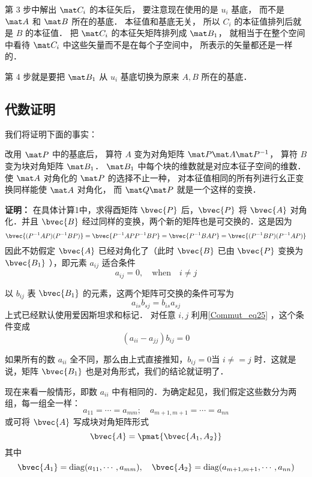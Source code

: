 第 3 步中解出 $\mat C_i$ 的本征矢后， 要注意现在使用的是 $u_i$ 基底， 而不是 $\mat A$ 和 $\mat B$ 所在的基底． 本征值和基底无关， 所以 $C_i$ 的本征值排列后就是 $B$ 的本征值． 把 $\mat C_i$ 的本征矢矩阵排列成 $\mat B_1$， 就相当于在整个空间中看待 $\mat C_i$ 中这些矢量而不是在每个子空间中， 所表示的矢量都还是一样的．

第 4 步就是要把 $\mat B_1$ 从 $u_i$ 基底切换为原来 $A, B$ 所在的基底．


\subsection{代数证明}
我们将证明下面的事实：

改用 $\mat P$ 中的基底后， 算符 $A$ 变为对角矩阵 $\mat P \mat A\mat P^{-1}$， 算符 $B$ 变为块对角矩阵 $\mat B_1$． $\mat B_1$ 中每个块的维数就是对应本征子空间的维数． 使 $\mat A$ 对角化的 $\mat P$ 的选择不止一种， 对本征值相同的所有列进行幺正变换同样能使 $\mat A$ 对角化， 而 $\mat Q\mat P$ 就是一个这样的变换．

\textbf{证明：}
在具体计算1中，求得酉矩阵 $\bvec{P}$ 后，$\bvec{P}$ 将 $\bvec{A}$ 对角化．并且 $\bvec{B}$ 经过同样的变换，两个新的矩阵也是可交换的．这是因为
\begin{equation}
\bvec{(P^{-1}AP)(P^{-1}BP)}=\bvec{P^{-1}APP^{-1}BP}=\bvec{P^{-1}BAP}=\bvec{(P^{-1}BP)(P^{-1}AP)}
\end{equation}
因此不妨假定 $\bvec{A}$ 已经对角化了（此时 $\bvec{B}$ 已由 $\bvec{P}$ 变换为 $\bvec{B_1}$ ），即元素 $a_{ij}$ 适合条件
\begin{equation}
a_{ij}=0,\quad \mathrm{when} \quad i\neq j
\label{Commut_eq25}
\end{equation}

以 $b_{ij}$ 表 $\bvec{B_1}$ 的元素，这两个矩阵可交换的条件可写为
\begin{equation}
a_{is}b_{sj}=b_{is}a_{sj}
\end{equation}
上式已经默认使用爱因斯坦求和标记．
对任意 $i,j$ 利用\autoref{Commut_eq25} ，这个条件变成
\begin{equation}
(a_{ii}-a_{jj})b_{ij}=0
\label{Commut_eq27}
\end{equation}

如果所有的数 $a_{ii}$ 全不同，那么由上式直接推知，$b_{ij}=0$当 $i\neq=j$ 时．这就是说，矩阵 $\bvec{B_1}$ 也是对角形式，我们的结论就证明了．

现在来看一般情形，即数 $a_{ii}$ 中有相同的．为确定起见，我们假定这些数分为两组，每一组全一样：
\begin{equation}
a_{11}=\cdots=a_{mm};\quad a_{m+1,m+1}=\cdots=a_{nn}
\end{equation}
或可将 $\bvec{A}$ 写成块对角矩阵形式
\begin{equation}
\bvec{A}=\pmat{\bvec{A_1,A_2}}
\end{equation}
其中
\begin{equation}
\bvec{A_1}=\mathrm{diag}(a_{11},\cdots,a_{mm}),\quad
\bvec{A_2}=\mathrm{diag}(a_{m+1,m+1},\cdots,a_{nn})
\end{equation}


